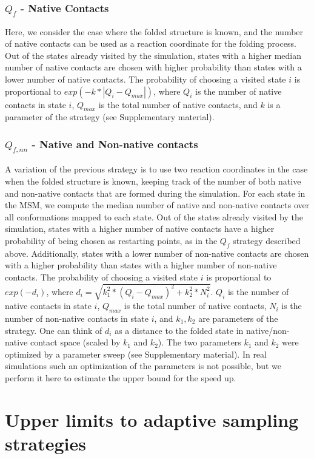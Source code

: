 \subsubsection{$Q_{f}$ - Native Contacts}
 Here, we
consider the case where the folded structure is known, and the number of native
contacts can be used as a reaction coordinate for the folding
process. Out of the states already visited by the simulation, states with a
higher median number of native contacts are chosen with higher probability than
states with a lower number of native contacts. The probability of choosing a
visited state $i$ is proportional to $exp( - k * | Q_i - Q_{max} | )$, where
$Q_i$ is the number of native contacts in state $i$, $Q_{max}$ is the total number of
native contacts, and $k$ is a parameter of the strategy (see Supplementary material).


\subsubsection{$Q_{f,nn}$ - Native and Non-native contacts} 
A variation of the previous strategy is to use two reaction coordinates in the
case when the folded structure is known, keeping track of the number of both
native and non-native contacts that are formed during the simulation. For each
state in the MSM, we compute the median number
of native and non-native contacts over all conformations mapped to each state.
Out of the states already visited by the simulation, states with a higher
number of native contacts have a higher probability of being chosen as
restarting points, as in the $Q_{f}$ strategy described above. Additionally,
states with a lower number of non-native contacts are chosen with a higher
probability than states with a higher number of non-native contacts. The
probability of choosing a visited state $i$ is proportional to $exp(-d_i)$,
where $d_i = \sqrt{k_1^2 * (Q_i - Q_{max})^2  + k_2^2 * N_i^2}$. $Q_i$
is the number of native contacts in state $i$, $Q_{max}$ is the total number of
native contacts, $N_i$ is the number of
non-native contacts in state $i$, and $k_1, k_2$ are parameters of the
strategy. One can think of $d_i$ as a distance to the folded state in
native/non-native contact space (scaled by $k_1$ and $k_2$). The two parameters
$k_1$ and $k_2$ were optimized by a parameter sweep (see Supplementary material). 
In real simulations such an optimization of the parameters is not
possible, but we perform it here to estimate the upper bound for the speed up.


\section{Upper limits to adaptive sampling strategies}


